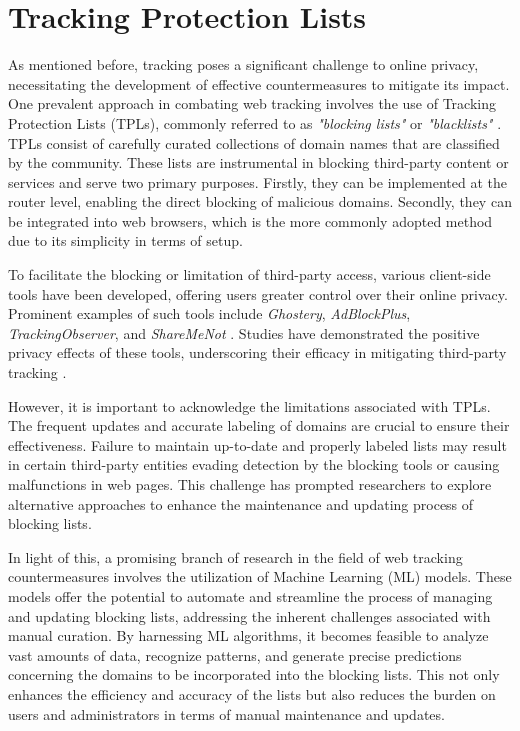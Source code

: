 \section{Tracking Protection Lists}

As mentioned before, tracking poses a significant challenge to online privacy, necessitating the development of effective countermeasures
to mitigate its impact. One prevalent approach in combating web tracking involves the use of Tracking Protection Lists (TPLs),
commonly referred to as \textit{"blocking lists"} or \textit{"blacklists"} \cite{bujlow2017survey,mayer2012third}. TPLs consist of carefully curated collections of domain names
that are classified by the community. These lists are instrumental in blocking third-party content or services and serve two
primary purposes. Firstly, they can be implemented at the router level, enabling the direct blocking of malicious domains.
Secondly, they can be integrated into web browsers, which is the more commonly adopted method due to its simplicity in terms of setup.

To facilitate the blocking or limitation of third-party access, various client-side tools have been developed, offering users greater
control over their online privacy. Prominent examples of such tools include \textit{Ghostery}, \textit{AdBlockPlus}, \textit{TrackingObserver}, and \textit{ShareMeNot}
\cite{ghostery, abp, trackingObserver, shareMeNot}.
Studies have demonstrated the positive privacy effects of these tools, underscoring their efficacy in mitigating third-party tracking \cite{kontaxis2015tracking}.

However, it is important to acknowledge the limitations associated with TPLs. The frequent updates and accurate labeling of domains are crucial
to ensure their effectiveness. Failure to maintain up-to-date and properly labeled lists may result in certain third-party entities evading detection
by the blocking tools or causing malfunctions in web pages. This challenge has prompted researchers to explore alternative approaches to enhance
the maintenance and updating process of blocking lists.

In light of this, a promising branch of research in the field of web tracking countermeasures involves the utilization of Machine Learning (ML)
models. These models offer the potential to automate and streamline the process of managing and updating blocking lists, addressing the inherent
challenges associated with manual curation. By harnessing ML algorithms, it becomes feasible to analyze vast amounts of data,
recognize patterns, and generate precise predictions concerning the domains to be incorporated into the blocking lists.
This not only enhances the efficiency
and accuracy of the lists but also reduces the burden on users and administrators in terms of manual maintenance and updates.

